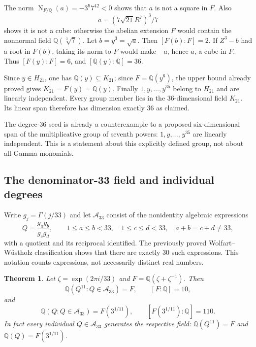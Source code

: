 \documentclass[11pt,a4paper]{article}
\newtheorem{theorem}{Theorem}[section]
\theoremstyle{definition}
\theoremstyle{remark}
\numberwithin{equation}{section}
\begin{document}
The norm $\operatorname N_{F/\mathbb Q}(a)=-3^9 7^{42}<0$ shows
that $a$ is not a square in $F$. Also
\[
 a=(7\sqrt{21}R^7)^3/7
\]
shows it is not a cube: otherwise the abelian extension $F$ would
contain the nonnormal field $\mathbb Q(\sqrt[3]7)$.
Let $b=y^3=\sqrt a$. Then $[F(b):F]=2$. If $Z^3-b$ had a root
in $F(b)$, taking its norm to $F$ would make $-a$, hence $a$, a cube
in $F$. Thus $[F(y):F]=6$, and $[\mathbb Q(y):\mathbb Q]=36$.

Since $y\in H_{21}$, one has $\mathbb Q(y)\subseteq K_{21}$;
since $F=\mathbb Q(y^6)$, the upper bound already proved gives
$K_{21}=F(y)=\mathbb Q(y)$. Finally $1,y,\ldots,y^{35}$ belong to
$H_{21}$ and are linearly independent. Every group member lies in the
$36$-dimensional field $K_{21}$. Its linear span therefore has dimension
exactly $36$ as claimed.

The degree-$36$ seed is already a counterexample to a proposed
six-dimensional span of the multiplicative group of seventh powers:
$1,y,\ldots,y^{35}$ are linearly independent. This is a statement about
this explicitly defined group, not about all Gamma monomials.


\subsection{The denominator-33 field and individual degrees}
Write $g_j=\Gamma(j/33)$ and let $\mathcal A_{33}$ consist of the
nonidentity algebraic expressions
\[
 Q=\frac{g_ag_b}{g_cg_d},\qquad
 1\leq a\leq b<33,\quad 1\leq c\leq d<33,\quad
 a+b=c+d\ne33,
\]
with a quotient and its reciprocal identified.  The previously proved
Wolfart--W\"ustholz classification shows that there are exactly $30$ such
expressions.  This notation counts expressions, not necessarily distinct
real numbers.

\begin{theorem}
Let $\zeta=\exp(2\pi i/33)$ and
$F=\mathbb Q(\zeta+\zeta^{-1})$.  Then
\[
 \mathbb Q(Q^{11}:Q\in\mathcal A_{33})=F,
 \qquad [F:\mathbb Q]=10,
\]
and
\[
 \mathbb Q(Q:Q\in\mathcal A_{33})=F(3^{1/11}),
 \qquad [F(3^{1/11}):\mathbb Q]=110.
\]
In fact every individual $Q\in\mathcal A_{33}$ generates the respective
field: $\mathbb Q(Q^{11})=F$ and
$\mathbb Q(Q)=F(3^{1/11})$.
\end{theorem}
\end{document}
